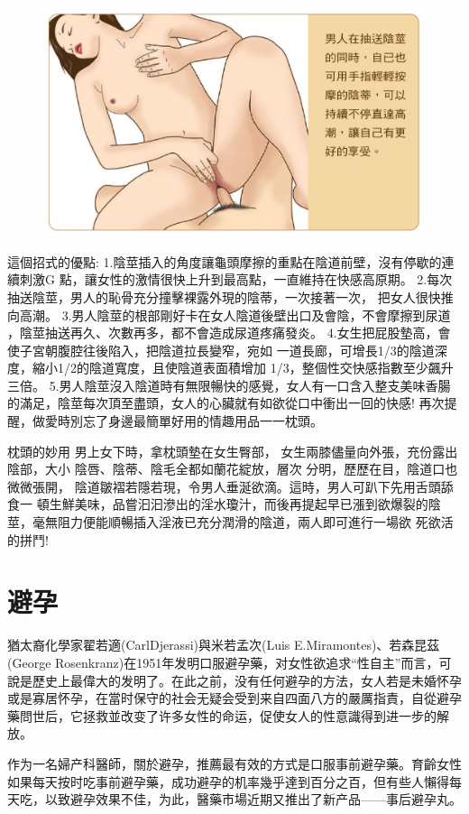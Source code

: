 \documentclass[12pt,UTF8]{ctexbook}
\begin{document}
\begin{figure}[htbp]
	\centering
	\includegraphics[width=0.7\linewidth]{31}
	\caption{}
	\label{fig:1}
\end{figure}

這個招式的優點:
1.陰莖插入的角度讓龜頭摩擦的重點在陰道前壁，沒有停歇的連續刺激G
點，讓女性的激情很快上升到最高點，一直維持在快感高原期。
2.每次抽送陰莖，男人的恥骨充分撞擊裸露外現的陰蒂，一次接著一次，
把女人很快推向高潮。
3.男人陰莖的根部剛好卡在女人陰道後壁出口及會陰，不會摩擦到尿道
，陰莖抽送再久、次數再多，都不會造成尿道疼痛發炎。
4.女生把屁股墊高，會使子宮朝腹腔往後陷入，把陰道拉長變窄，宛如
一道長廊，可增長1/3的陰道深度，縮小1/2的陰道寬度，且使陰道表面積增加
1/3，整個性交快感指數至少飆升三倍。
5.男人陰莖沒入陰道時有無限暢快的感覺，女人有一口含入整支美味香腸
的滿足，陰莖每次頂至盡頭，女人的心臟就有如欲從口中衝出一回的快感!
再次提醒，做愛時別忘了身邊最簡單好用的情趣用品一一枕頭。

枕頭的妙用
男上女下時，拿枕頭墊在女生臀部，
女生兩膝儘量向外張，充份露出陰部，大小
陰唇、陰蒂、陰毛全都如蘭花綻放，層次
分明，歷歷在目，陰道口也微微張開，
陰道皺褶若隱若現，令男人垂涎欲滴。這時，男人可趴下先用舌頭舔食一
頓生鮮美味，品嘗汩汩滲出的淫水瓊汁，而後再提起早已漲到欲爆裂的陰
莖，毫無阻力便能順暢插入淫液已充分潤滑的陰道，兩人即可進行一場欲
死欲活的拼鬥!



\chapter{避孕}

猶太裔化學家翟若適(CarlDjerassi)與米若孟次(Luis E.Miramontes)、若森昆茲(George Rosenkranz)在1951年发明口服避孕藥，对女性欲追求“性自主”而言，可說是歷史上最偉大的发明了。在此之前，没有任何避孕的方法，女人若是未婚怀孕或是寡居怀孕，在當时保守的社会无疑会受到来自四面八方的嚴厲指責，自從避孕藥問世后，它拯救並改变了许多女性的命运，促使女人的性意識得到进一步的解放。

作为一名婦产科醫師，關於避孕，推薦最有效的方式是口服事前避孕藥。育齡女性如果每天按时吃事前避孕藥，成功避孕的机率幾乎達到百分之百，但有些人懶得每天吃，以致避孕效果不佳，为此，醫藥市場近期又推出了新产品——事后避孕丸。
\end{document}
